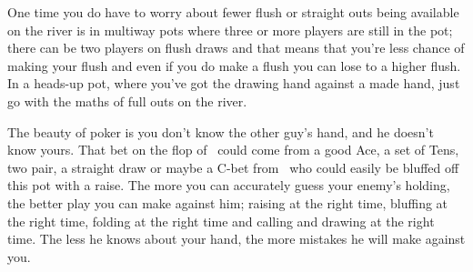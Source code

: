 One time you do have to worry about fewer flush or straight outs being
available on the river is in multiway pots where three or more players
are still in the pot; there can be two players on flush draws and that
means that you're less chance of making your flush and even if you do
make a flush you can lose to a higher flush. In a heads-up
pot, where you've got the drawing hand against a made hand, just go
with the maths of full outs on the river.

The beauty of poker is you don't know the other guy's hand, and he
doesn't know yours. That bet on the flop of \Ad\tens\eigd\ could come
from a good Ace, a set of Tens, two pair, a straight draw or maybe a
C-bet from \sixc\sixs\ who could easily be bluffed off this pot with a
raise. The more you can accurately guess your enemy's holding, the
better play you can make against him; raising at the right time,
bluffing at the right time, folding at the right time and calling and
drawing at the right time. The less he knows about your hand, the more
mistakes he will make against you.





